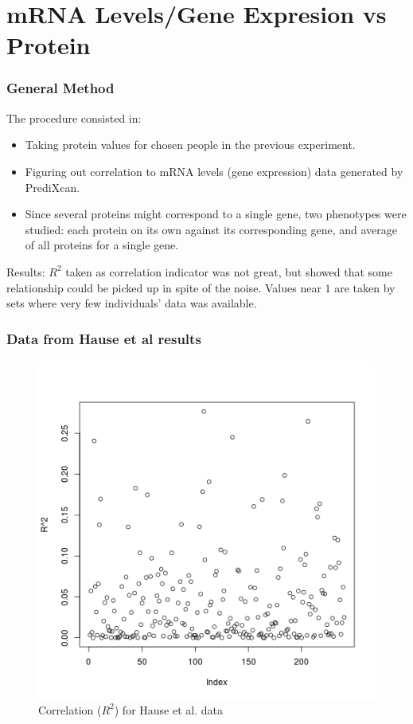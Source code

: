 \documentclass{beamer}
\begin{document}
  \section{mRNA Levels/Gene Expresion vs Protein}
    \begin{frame}
    \frametitle{General Method}
    The procedure consisted in:
    \begin{itemize}
      \item
      Taking protein values for chosen people in the previous experiment.
      \item
      Figuring out correlation to mRNA levels (gene expression) data generated by PrediXcan.
      \item
      Since several proteins might correspond to a single gene, 
      two phenotypes were studied: each protein on its own against its corresponding gene, 
      and average of all proteins for a single gene.
    \end{itemize}
    \vskip15pt
    Results:
    $R^2$ taken as correlation indicator was not great, but showed that some relationship could be picked up in spite of the noise.
    Values near $1$ are taken by sets where very few individuals' data was available.
  \end{frame}
  
  \begin{frame}
    \frametitle{Data from Hause et al results}
    \begin{center}
      \begin{figure}
      \includegraphics[scale=0.3]{../Out/hause-mrna-protein-r-squared.png}
      \caption{Correlation ($R^2$) for Hause et al. data}
      \end{figure}
    \end{center}
  \end{frame}
\end{document}
